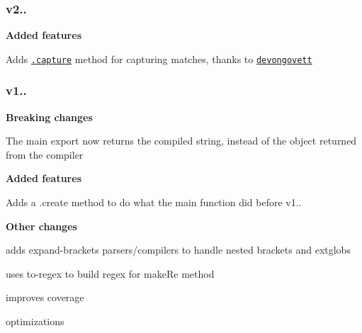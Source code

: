 \subsubsection*{v2..}

{\bfseries Added features}


\begin{DoxyItemize}
\item Adds \href{readme.md#capture}{\tt .capture} method for capturing matches, thanks to \href{https://github.com/devongovett}{\tt devongovett}
\end{DoxyItemize}

\subsubsection*{v1..}

{\bfseries Breaking changes}


\begin{DoxyItemize}
\item The main export now returns the compiled string, instead of the object returned from the compiler
\end{DoxyItemize}

{\bfseries Added features}


\begin{DoxyItemize}
\item Adds a {\ttfamily .create} method to do what the main function did before v1..
\end{DoxyItemize}

{\bfseries Other changes}


\begin{DoxyItemize}
\item adds {\ttfamily expand-\/brackets} parsers/compilers to handle nested brackets and extglobs
\item uses {\ttfamily to-\/regex} to build regex for {\ttfamily make\+Re} method
\item improves coverage
\item optimizations 
\end{DoxyItemize}